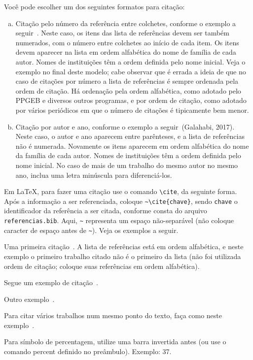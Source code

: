 \documentclass[a4paper, 12pt]{ppgeb}
\newcommand{\percentagesignscale}{0.8}
\newcommand{\percent}{\scalebox{\percentagesignscale}{~\%}}
\begin{document}
Você pode escolher um dos seguintes formatos para citação:
\begin{enumerate}[a)]
\item Citação pelo número da referência entre colchetes, conforme o exemplo a seguir~\cite{Kachuee2017}. Neste caso, os itens das lista de referências devem ser também numerados, com o número entre colchetes ao início de cada item. Os itens devem aparecer na lista em ordem alfabética do nome de família de cada autor. Nomes de instituições têm a ordem definida pelo nome inicial. Veja o exemplo no final deste modelo; cabe observar que é errada a ideia de que no caso de citações por número a lista de referências é sempre ordenada pela ordem de citação. Há ordenação pela ordem alfabética, como adotado pelo PPGEB e diversos outros programas, e por ordem de citação, como adotado por vários periódicos em que o número de citações é tipicamente bem menor.
\item Citação por autor e ano, conforme o exemplo a seguir~(Galahabi, 2017). Neste caso, o autor e ano aparecem entre parênteses, e a lista de referências não é numerada. Novamente os itens aparecem em ordem alfabética do nome da família de cada autor. Nomes de instituições têm a ordem definida pelo nome inicial. No caso de mais de um trabalho do mesmo autor no mesmo ano, inclua uma letra minúscula para diferenciá-los.
\end{enumerate}

Em LaTeX, para fazer uma citação use o comando \verb|\cite|, da seguinte forma. Após a informação a ser referenciada, coloque \verb|~\cite{chave}|, sendo \verb|chave| o identificador da referência a ser citada, conforme consta do arquivo \verb|referencias.bib|. Aqui, \verb|~| representa um espaço não-separável (não coloque caracter de espaço antes de \verb|~|). Veja os exemplos a seguir.

Uma primeira citação~\cite{Kachuee2017}. A lista de referências está em ordem alfabética, e neste exemplo o primeiro trabalho citado não é o primeiro da lista (não foi utilizada ordem de citação; coloque suas referências em ordem alfabética).

Segue um exemplo de citação~\cite{Gabriel2017}.

Outro exemplo~\cite{Ghahabi2017}.

Para citar vários trabalhos num mesmo ponto do texto, faça como neste exemplo~\cite{Kachuee2017,Gabriel2017,Ghahabi2017}.

Para símbolo de percentagem, utilize uma barra invertida antes (ou use o comando percent definido no preâmbulo). Exemplo: 37\percent.
\end{document}

